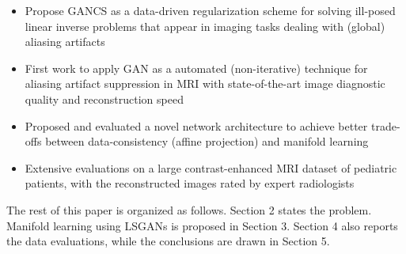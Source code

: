 \documentclass{journal}
\begin{document}
\begin{itemize}
	
	
	\item Propose GANCS as a data-driven regularization scheme for solving ill-posed linear inverse problems that appear in imaging tasks dealing with (global) aliasing artifacts 
	
	\item First work to apply GAN as a automated (non-iterative) technique for aliasing artifact suppression in MRI with state-of-the-art image diagnostic quality and reconstruction speed

	\item Proposed and evaluated a novel network architecture to achieve better trade-offs between data-consistency (affine projection) and manifold learning 
			
	\item Extensive evaluations on a large contrast-enhanced MRI dataset of pediatric patients, with the reconstructed images rated by expert radiologists
	
	
	
\end{itemize}





The rest of this paper is organized as follows. Section 2 states the problem. Manifold learning using LSGANs is proposed in Section 3. Section 4 also reports the data evaluations, while the conclusions are drawn in Section 5. 








 
\end{document}
